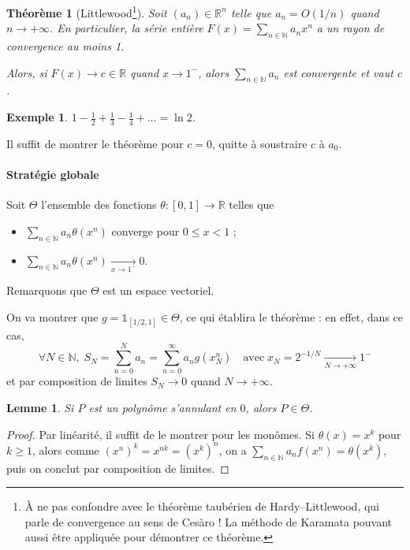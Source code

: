 \documentclass[a4paper, 11pt]{article}
\def\N{\mathbb{N}}
\def\R{\mathbb{R}}
\def\Indic{\mathbb{1}}
\newtheorem*{example}{Exemple}
\newtheorem*{theorem}{Théorème}
\newtheorem*{lemma}{Lemme}
\begin{document}
\begin{theorem}[Littlewood\footnote{À ne pas confondre avec le théorème
    taubérien de Hardy--Littlewood, qui parle de convergence au sens de Cesàro ! La
    méthode de Karamata pouvant aussi être appliquée pour démontrer ce théorème.}]
  Soit $(a_n) \in \R^n$ telle que $a_n = O(1/n)$ quand $n \to +\infty$. En
  particulier, la série entière $F(x) = \sum_{n \in \N} a_n x^n$ a un rayon de
  convergence au moins 1.

  Alors, si $F(x) \to c \in \R$ quand $x \to 1^-$, alors $\sum_{n \in \N} a_n$
  est convergente et vaut $c$.
\end{theorem}

\begin{example}
  $\displaystyle 1 - \frac{1}{2} + \frac{1}{3} - \frac{1}{4} + \ldots = \ln 2$.
\end{example}

Il suffit de montrer le théorème pour $c = 0$, quitte à soustraire $c$ à $a_0$.

\paragraph{Stratégie globale} Soit $\Theta$ l'ensemble des fonctions $\theta :
[0,1] \to \R$ telles que
\begin{itemize}
\item $\displaystyle \sum_{n \in \N} a_n \theta(x^n)$ converge pour $0 \leq x < 1$ ;
\item $\displaystyle \sum_{n \in \N} a_n \theta(x^n) \xrightarrow[x \to 1^{-}]{} 0$.
\end{itemize}
Remarquons que $\Theta$ est un espace vectoriel.

On va montrer que $g = \Indic_{[1/2, 1]} \in \Theta$, ce qui établira le
théorème : en effet, dans ce cas,
\[ \forall N \in \N,\; S_N =  \sum_{n = 0}^N a_n = \sum_{n = 0}^{\infty} a_n
  g(x_N^n) \quad \text{avec}\; x_N = 2^{-1/N} \xrightarrow[N \to +\infty]{} 1^- \]
et par composition de limites $S_N \rightarrow 0$ quand $N \to +\infty$.

\begin{lemma}
  Si $P$ est un polynôme s'annulant en $0$, alors $P \in \Theta$.
\end{lemma}
\begin{proof}
  Par linéarité, il suffit de le montrer pour les monômes. Si $\theta(x) = x^k$
  pour $k \geq 1$, alors comme $(x^n)^k = x^{nk} = (x^k)^n$, on a $\sum_{n \in
    \N} a_n f(x^n) = \theta(x^k)$, puis on conclut par composition de limites.
\end{proof}
\end{document}
